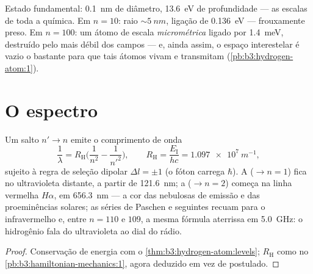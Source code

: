 \begin{example}\label{ex:b3:hydrogen-atom:sizes}
Estado fundamental: \qty{0.1}{nm} de diâmetro, \qty{13.6}{eV} de
profundidade --- as escalas de toda a química. Em $n = 10$: raio
$\sim\qty{5}{nm}$, ligação de \qty{0.136}{eV} --- frouxamente preso. Em
$n = 100$: um átomo de escala \emph{micrométrica} ligado por
\qty{1.4}{meV}, destruído pelo mais débil dos campos --- e, ainda
assim, o espaço interestelar é vazio o bastante para que tais átomos
vivam e transmitam (\cref{pb:b3:hydrogen-atom:1}).
\end{example}

\section{O espectro}

\begin{proposition}\label{prop:b3:hydrogen-atom:series}
Um salto $n' \to n$ emite o comprimento de onda
\[
\frac{1}{\lambda} = R_{\text{H}}\Big(\frac{1}{n^2} -
\frac{1}{n'^2}\Big) , \qquad
R_{\text{H}} = \frac{E_{\text{I}}}{hc} = \qty{1.097e7}{m^{-1}} ,
\]
sujeito à regra de seleção dipolar $\Delta l = \pm1$ (o fóton carrega
$\hbar$). A  ($\to n = 1$) fica no ultravioleta distante,
a partir de \qty{121.6}{nm}; a  ($\to n = 2$) começa na
linha vermelha $H\alpha$, em \qty{656.3}{nm} --- a cor das nebulosas de
emissão e das proeminências solares; as séries de Paschen e seguintes
recuam para o infravermelho e, entre $n = 110$ e $109$, a mesma fórmula
aterrissa em \qty{5.0}{GHz}: o hidrogênio fala do ultravioleta ao dial
do rádio.
\end{proposition}

\begin{proof}
Conservação de energia com o \cref{thm:b3:hydrogen-atom:levels};
$R_{\text{H}}$ como no \cref{pb:b3:hamiltonian-mechanics:1}, agora
deduzido em vez de postulado.
\end{proof}

